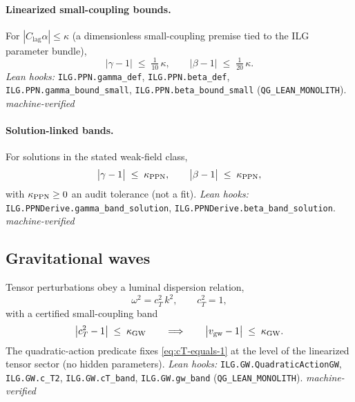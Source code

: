 \documentclass[12pt,a4paper]{article}
\begin{document}
\paragraph{Linearized small-coupling bounds.}
For \(|C_{\!\mathrm{lag}}\alpha| \le \kappa\) (a dimensionless small-coupling premise tied to the ILG parameter bundle),
\begin{equation}
  \bigl|\gamma - 1\bigr| \;\le\; \tfrac{1}{10}\,\kappa,
  \qquad
  \bigl|\beta - 1\bigr| \;\le\; \tfrac{1}{20}\,\kappa.
  \label{eq:ppn-linear-bounds}
\end{equation}
\emph{Lean hooks:} \texttt{ILG.PPN.gamma\_def}, \texttt{ILG.PPN.beta\_def}, \texttt{ILG.PPN.gamma\_bound\_small}, \texttt{ILG.PPN.beta\_bound\_small} (\texttt{QG\_LEAN\_MONOLITH}). \emph{machine-verified}

\paragraph{Solution-linked bands.}
For solutions in the stated weak-field class,
\begin{equation}
  \bigl|\gamma-1\bigr| \;\le\; \kappa_{\rm PPN},
  \qquad
  \bigl|\beta-1\bigr| \;\le\; \kappa_{\rm PPN},
  \label{eq:ppn-solution-bands}
\end{equation}
with \(\kappa_{\rm PPN}\ge 0\) an audit tolerance (not a fit). \emph{Lean hooks:} \texttt{ILG.PPNDerive.gamma\_band\_solution}, \texttt{ILG.PPNDerive.beta\_band\_solution}. \emph{machine-verified}

\subsection{Gravitational waves}
Tensor perturbations obey a luminal dispersion relation,
\begin{equation}
  \omega^2 = c_T^2\,k^2,\qquad c_T^2=1,
  \label{eq:cT-equals-1}
\end{equation}
with a certified small-coupling band
\begin{equation}
  \bigl|c_T^2-1\bigr| \;\le\; \kappa_{\rm GW}
  \qquad\Longrightarrow\qquad
  \bigl|v_{\rm gw}-1\bigr| \;\le\; \kappa_{\rm GW}.
  \label{eq:gw-band-full}
\end{equation}
The quadratic-action predicate fixes \eqref{eq:cT-equals-1} at the level of the linearized tensor sector (no hidden parameters). \emph{Lean hooks:} \texttt{ILG.GW.QuadraticActionGW}, \texttt{ILG.GW.c\_T2}, \texttt{ILG.GW.cT\_band}, \texttt{ILG.GW.gw\_band} (\texttt{QG\_LEAN\_MONOLITH}). \emph{machine-verified}
\end{document}
